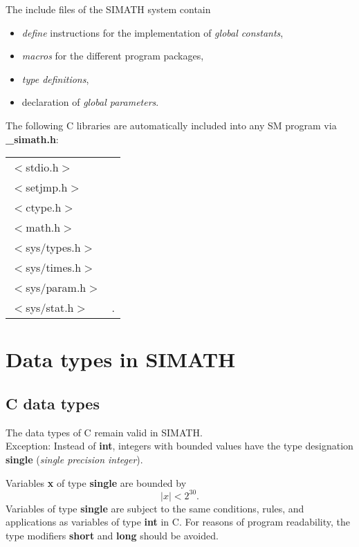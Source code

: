 The include files of the SIMATH system contain
\begin{itemize}
\item {\em define} instructions for the implementation of 
      {\em global constants\/},
\item {\em macros\/} for the different program packages,
\item {\em type definitions\/},
\item declaration of {\em global parameters\/}.
\end{itemize}
The following C libraries are automatically included into any SM program via
{\bf \_simath.h}:
\begin{tabular}{ll} 
$<$stdio.h$>$ &\\ 
$<$setjmp.h$>$ &\\ 
$<$ctype.h$>$ &\\
$<$math.h$>$ &\\
$<$sys/types.h$>$&\\
$<$sys/times.h$>$&\\
$<$sys/param.h$>$&\\
$<$sys/stat.h$>$&.\\
\end{tabular} 


\newpage
\section{Data types in SIMATH}
\subsection{C data types}
The data types of C remain valid in SIMATH.\\
Exception: Instead of {\bf int}, integers with bounded 
values have the type de\-sig\-nation {\bf single} ({\em single precision 
integer\/}).

Variables {\bf x} of type {\bf single} are bounded by
$$ |x| < 2^{30} .$$
Variables of type {\bf single} are subject to the same conditions, rules,
and ap\-pli\-ca\-tions as variables of type {\bf int} in C. For reasons of program
readability, the type modifiers {\bf short} and {\bf long} should be avoided.

